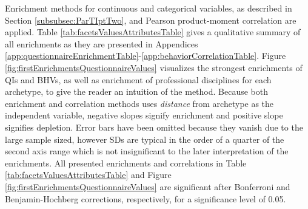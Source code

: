 Enrichment methods for continuous and categorical variables, as described in Section \ref{subsubsec:ParTIptTwo}, and Pearson product-moment correlation are applied.
Table \ref{tab:facetsValuesAttributesTable} gives a qualitative summary of all enrichments as they are presented in Appendices \ref{app:questionnaireEnrichmentTable}-\ref{app:behaviorCorrelationTable}.
Figure \ref{fig:firstEnrichmentsQuestionnaireValues} visualizes the strongest enrichments of QIs and BHVs, as well as enrichment of professional disciplines for each archetype, to give the reader an intuition of the method.
Because both enrichment and correlation methods uses \textit{distance} from archetype as the independent variable, negative slopes signify enrichment and positive slope signifies depletion.
Error bars have been omitted because they vanish due to the large sample sized, however SDs are typical in the order of a quarter of the second axis range which is not insignificant to the later interpretation of the enrichments.
All presented enrichments and correlations in Table \ref{tab:facetsValuesAttributesTable} and Figure \ref{fig:firstEnrichmentsQuestionnaireValues} are significant after Bonferroni and Benjamin-Hochberg corrections, respectively, for a significance level of 0.05.

